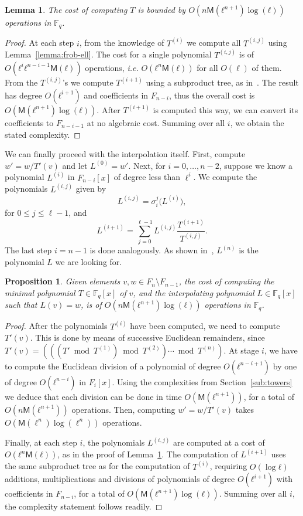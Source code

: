 \documentclass{lms}
\newtheorem{lem}[thm]{Lemma}
\newtheorem{prop}[thm]{Proposition}
\def\cout#1{\mathsf{#1}}
\newcommand{\F}{\mathbb{F}}
\newcommand{\MM}{\cout{M}}
\begin{document}
\begin{lem}\label{lemma:interpolation:minpoly}
  The cost of computing $T$ is bounded by $O(n\MM(ℓ^{n+1})\log(ℓ))$
  operations in $\F_q$.
\end{lem}

\begin{proof}
  At each step $i$, from the knowledge of $T^{(i)}$ we compute all
  $T^{(i,j)}$ using Lemma~\ref{lemma:frob-ell}. The cost for a single
  polynomial $T^{(i,j)}$ is of $O(ℓ^iℓ^{n-i-1}\MM(ℓ))$ operations,
  \emph{i.e.} $O(ℓ^n\MM(ℓ))$ for all $O(\ell)$ of them.
  From the $T^{(i,j)}$'s we compute $T^{(i+1)}$ using a subproduct
  tree, as in~\cite[Lemma~10.4]{vzGG}. The result has degree
  $O(ℓ^{i+1})$ and coefficients in $F_{n-i}$, thus the overall cost is
  $O(\MM(ℓ^{n+1})\log(ℓ))$. After $T^{(i+1)}$ is computed this way, we
  can convert its coefficients to $F_{n-i-1}$ at no algebraic cost.
  Summing over all $i$, we obtain the stated complexity.
\end{proof}

We can finally proceed with the interpolation itself. First, compute
$w' = w/T'(v)$ and let $L^{(0)}=w'$.  Next, for $i=0,\dots,n-2$,
suppose we know a polynomial $L^{(i)}$ in $F_{n-i}[x]$ of degree less
than $\ell^i$. We compute the polynomials $L^{(i,j)}$ given by
$$L^{(i,j)}= \sigma_i^j\bigl(L^{(i)}\bigr),$$
for $0 \le j \le \ell-1$, and
$$L^{(i+1)} = \sum_{j=0}^{\ell-1} L^{(i,j)}\frac{T^{(i+1)}}{T^{(i,j)}}.$$ The last step $i=n-1$
is done analogously.  As shown in~\cite{df10}, $L^{(n)}$ is the
polynomial $L$ we are looking for.

\begin{prop}
  Given elements $v,w∈F_n\setminus F_{n-1}$, the cost of computing the
  minimal polynomial $T∈\F_q[x]$ of $v$, and the interpolating
  polynomial $L∈\F_q[x]$ such that $L(v)=w$, is of $O(n\MM(ℓ^{n+1})\log(ℓ))$
  operations in $\F_q$.
\end{prop}
\begin{proof}
  After the polynomials $T^{(i)}$ have been computed, we need to
  compute $T'(v)$. This is done by means of successive Euclidean
  remainders, since
  $T'(v) = (((T' \bmod T^{(1)}) \bmod T^{(2)}) \cdots \bmod T^{(n)})$.
  At stage $i$, we have to compute the Euclidean division of a
  polynomial of degree $O(ℓ^{n-i+1})$ by one of degree $O(ℓ^{n-i})$ in
  $F_i[x]$. Using the complexities from Section~\ref{sub:towers} we
  deduce that each division can be done in time $O(\MM(ℓ^{n+1}))$, for
  a total of $O(n\MM(ℓ^{n+1}))$ operations. Then, computing
  $w' = w/T'(v)$ takes $O(\MM(\ell^n)\log(\ell^n))$ operations.

  Finally, at each step $i$, the polynomials $L^{(i,j)}$ are computed
  at a cost of $O(ℓ^n\MM(ℓ))$, as in the proof of
  Lemma~\ref{lemma:interpolation:minpoly}.  The computation of
  $L^{(i+1)}$ uses the same subproduct tree as for the computation of
  $T^{(i)}$, requiring $O(\log ℓ)$ additions, multiplications and
  divisions of polynomials of degree $O(ℓ^{i+1})$ with coefficients in
  $F_{n-i}$, for a total of $O(\MM(ℓ^{n+1})\log(ℓ))$. Summing over all
  $i$, the complexity statement follows readily.
\end{proof}
\end{document}
